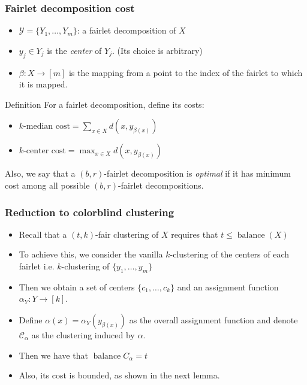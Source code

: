 \documentclass{beamer}
\DeclareMathOperator{\balance}{balance}
\begin{document}
\begin{frame}
\frametitle{Fairlet decomposition cost}

\begin{itemize}
	\item $\mathcal{Y} = \{ Y_1, \dots, Y_m \}$: a fairlet decomposition of $X$
	\item $y_j \in Y_j$ is the {\it center} of $Y_j$. (Its choice is arbitrary)
	\item $\beta : X \rightarrow [m]$ is the mapping from a point to the index of the fairlet to which it is mapped.
\end{itemize}

\begin{block}{Definition}
For a fairlet decomposition, define its costs:

\begin{itemize}
	\item $k \text{-median cost} = \sum_{x \in X} d \left(x, y_{\beta(x)}\right)$
	\item $k \text{-center cost} = \max_{x \in X} d \left(x, y_{\beta(x)}\right)$
\end{itemize}

Also, we say that a $(b, r)$-fairlet decomposition is {\it optimal} if it has minimum cost among all possible $(b, r)$-fairlet decompositions.
\end{block}

\end{frame}



\begin{frame}
\frametitle{Reduction to colorblind clustering}

\begin{itemize}
	\item Recall that a $(t, k)$-fair clustering of $X$ requires that $t \leq \balance(X)$ \pause
	
	\item To achieve this, we consider the vanilla $k$-clustering of the \alert{centers of each fairlet} i.e. $k$-clustering of $\{y_1, \dots, y_m\}$ \pause
	
	\item Then we obtain a set of centers $\{c_1, \dots, c_k\}$ and an assignment function $\alpha_Y : Y \rightarrow [k]$. \pause
	
	\item Define $\alpha(x) = \alpha_Y(y_{\beta(x)})$ as the overall assignment function and denote $\mathcal{C}_\alpha$ as the clustering induced by $\alpha$. \pause
	
	\item Then we have that $\balance{C_\alpha} = t$ \pause
	
	\item Also, its cost is bounded, as shown in the next lemma.
\end{itemize}

\end{frame}
\end{document}

